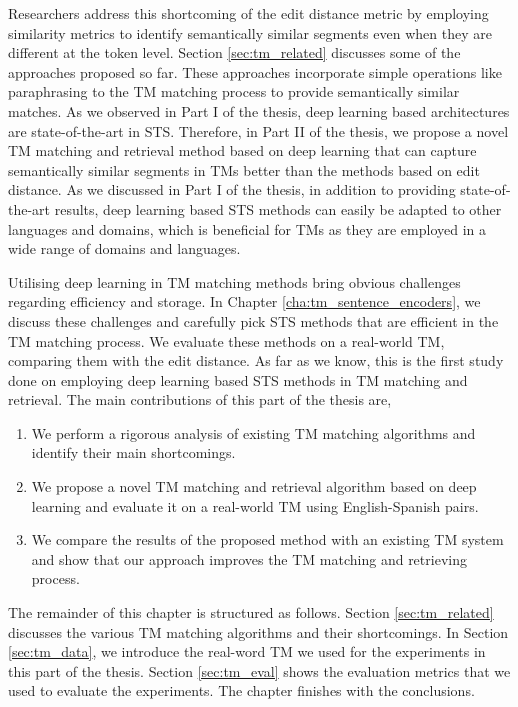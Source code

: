 Researchers address this shortcoming of the edit distance metric by employing similarity metrics to identify semantically similar segments even when they are different at the token level. Section \ref{sec:tm_related} discusses some of the approaches proposed so far. These approaches incorporate simple operations like paraphrasing to the TM matching process to provide semantically similar matches. As we observed in Part I of the thesis, deep learning based architectures are state-of-the-art in STS. Therefore, in Part II of the thesis, we propose a novel TM matching and retrieval method based on deep learning that can capture semantically similar segments in TMs better than the methods based on edit distance. As we discussed in Part I of the thesis, in addition to providing state-of-the-art results, deep learning based STS methods can easily be adapted to other languages and domains, which is beneficial for TMs as they are employed in a wide range of domains and languages. 

Utilising deep learning in TM matching methods bring obvious challenges regarding efficiency and storage. In Chapter \ref{cha:tm_sentence_encoders}, we discuss these challenges and carefully pick STS methods that are efficient in the TM matching process. We evaluate these methods on a real-world TM, comparing them with the edit distance. As far as we know, this is the first study done on employing deep learning based STS methods in TM matching and retrieval. The main contributions of this part of the thesis are, 

\begin{enumerate}
	\item We perform a rigorous analysis of existing TM matching algorithms and identify their main shortcomings.
	\item We propose a novel TM matching and retrieval algorithm based on deep learning and evaluate it on a real-world TM using English-Spanish pairs. 
	\item We compare the results of the proposed method with an existing TM system and show that our approach improves the TM matching and retrieving process.
\end{enumerate}

The remainder of this chapter is structured as follows. Section \ref{sec:tm_related} discusses the various TM matching algorithms and their shortcomings. In Section \ref{sec:tm_data}, we introduce the real-word TM we used for the experiments in this part of the thesis. Section \ref{sec:tm_eval} shows the evaluation metrics that we used to evaluate the experiments. The chapter finishes with the conclusions. 

